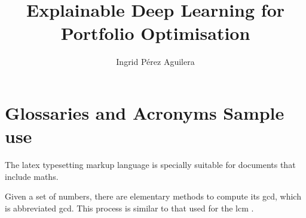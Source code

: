 \documentclass[]{kclthesis}
\title{Explainable Deep Learning for Portfolio Optimisation}
\author{Ingrid Pérez Aguilera}
\theoremstyle{definition}
\begin{document}

\maketitle 

\newpage
\thispagestyle{empty}
\mbox{}
\newpage




\setcounter{tocdepth}{4}
\doublespacing
\tableofcontents
\newpage

\listoffigures
\newpage

\listoftables
\newpage


\printnomenclature
\newpage


\printglossary
\printglossary[type=\acronymtype]
\newpage

\onehalfspacing
\setlength{\parindent}{0pt}
\setlength{\parskip}{6pt}


\doublespacing
\section{Glossaries and Acronyms Sample use}
The \Gls{latex} typesetting markup language is specially suitable for documents that include \gls{maths}. 

Given a set of numbers, there are elementary methods to compute its \acrlong{gcd}, which is abbreviated \acrshort{gcd}. This  process is similar to that used for the \acrfull{lcm} \cite{Doe11}.









\renewcommand{\bibname}{References}

 


\end{document}
